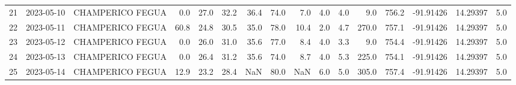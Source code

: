 \documentclass[12pt]{article}
\begin{document}
\begin{center}
\begin{tabular}{lllrrrrrrrrrrrrr}
21  & 2023-05-10 &  CHAMPERICO FEGUA &     0.0 &  27.0 &   32.2 &  36.4 &     74.0 &        7.0 &  4.0 &         4.0 &         9.0 &      756.2 & -91.91426 &  14.29397 &      5.0 \\
22  & 2023-05-11 &  CHAMPERICO FEGUA &    60.8 &  24.8 &   30.5 &  35.0 &     78.0 &       10.4 &  2.0 &         4.7 &       270.0 &      757.1 & -91.91426 &  14.29397 &      5.0 \\
23  & 2023-05-12 &  CHAMPERICO FEGUA &     0.0 &  26.0 &   31.0 &  35.6 &     77.0 &        8.4 &  4.0 &         3.3 &         9.0 &      754.4 & -91.91426 &  14.29397 &      5.0 \\
24  & 2023-05-13 &  CHAMPERICO FEGUA &     0.0 &  26.4 &   31.2 &  35.6 &     74.0 &        8.7 &  4.0 &         5.3 &       225.0 &      754.1 & -91.91426 &  14.29397 &      5.0 \\
25  & 2023-05-14 &  CHAMPERICO FEGUA &    12.9 &  23.2 &   28.4 &   NaN &     80.0 &        NaN &  6.0 &         5.0 &       305.0 &      757.4 & -91.91426 &  14.29397 &      5.0 \\
\bottomrule
\end{tabular}

        
        \end{center}
        
\end{document}
